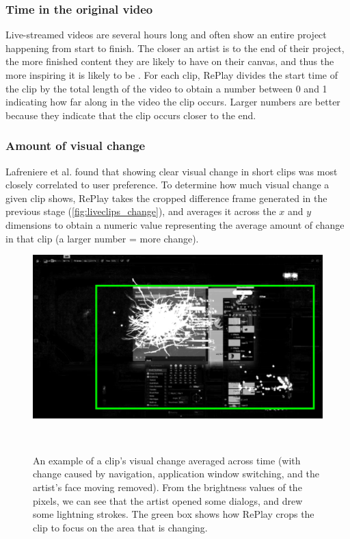 \subsubsection{Time in the original video}
Live-streamed videos are several hours long and often show an entire project happening from start to finish. The closer an artist is to the end of their project, the more finished content they are likely to have on their canvas, and thus the more inspiring it is likely to be%
. For each clip, RePlay divides the start time of the clip by the total length of the video to obtain a number between 0 and 1 indicating how far along in the video the clip occurs. Larger numbers are better because they indicate that the clip occurs closer to the end.

\subsubsection{Amount of visual change}
 Lafreniere et al. \cite{Lafreniere2014} found that showing clear visual change in short clips was most closely correlated to user preference. To determine how much visual change a given clip shows, RePlay takes the cropped difference frame generated in the previous stage (\autoref{fig:liveclips_change}), and averages it across the $x$ and $y$ dimensions to obtain a numeric value representing the average amount of change in that clip (a larger number = more change).

\begin{figure}[b!]
\centering
  \includegraphics[width=\columnwidth]{liveclips/figures/change.png}
  \caption{An example of a clip's visual change averaged across time (with change caused by navigation, application window switching, and the artist's face moving removed). From the brightness values of the pixels, we can see that the artist opened some dialogs, and drew some lightning strokes. The green box shows how RePlay crops the clip to focus on the area that is changing. }~\label{fig:liveclips_change}
\end{figure}

